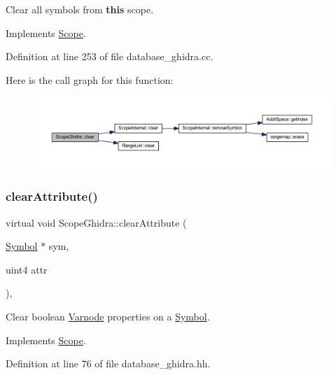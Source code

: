 Clear all symbols from {\bfseries{this}} scope. 



Implements \mbox{\hyperlink{class_scope_a9bfa2b0a98ba3ceeafd5a1e7ad2e2c21}{Scope}}.



Definition at line 253 of file database\+\_\+ghidra.\+cc.

Here is the call graph for this function\+:
\nopagebreak
\begin{figure}[H]
\begin{center}
\leavevmode
\includegraphics[width=350pt]{class_scope_ghidra_a2ebfecc6211081f8f2411c006cc867de_cgraph}
\end{center}
\end{figure}
\mbox{\label{class_scope_ghidra_a82f1b5f561b339b03471d39349d108dd}} 
\subsubsection{\texorpdfstring{clearAttribute()}{clearAttribute()}}
{\footnotesize\ttfamily virtual void Scope\+Ghidra\+::clear\+Attribute (\begin{DoxyParamCaption}\item[{\mbox{\hyperlink{class_symbol}{Symbol}} $\ast$}]{sym,  }\item[{uint4}]{attr }\end{DoxyParamCaption})\hspace{0.3cm}{\ttfamily [inline]}, {\ttfamily [virtual]}}



Clear boolean \mbox{\hyperlink{class_varnode}{Varnode}} properties on a \mbox{\hyperlink{class_symbol}{Symbol}}. 



Implements \mbox{\hyperlink{class_scope_afb57165fd0d3c182e18ea24e7231975d}{Scope}}.



Definition at line 76 of file database\+\_\+ghidra.\+hh.

